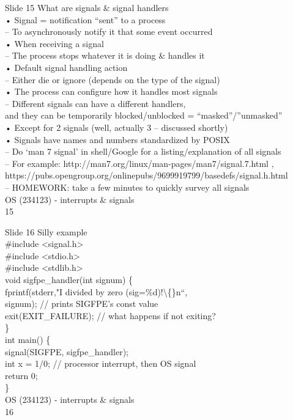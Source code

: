 \documentclass{beamer}
\begin{document}
\begin{frame}{Slide 15}
What are signals \& signal handlers \\• Signal = notification “sent” to a process\\– To asynchronously notify it that some event occurred \\• When receiving a signal\\– The process stops whatever it is doing \& handles it\\• Default signal handling action\\– Either die or ignore (depends on the type of the signal)\\• The process can configure how it handles most signals\\– Different signals can have a different handlers, \\and they can be temporarily blocked/unblocked = “masked”/”unmasked”\\• Except for 2 signals (well, actually 3 – discussed shortly)\\• Signals have names and numbers standardized by POSIX\\– Do ‘man 7 signal’ in shell/Google for a listing/explanation of all signals\\– For example: http://man7.org/linux/man-pages/man7/signal.7.html ,\\https://pubs.opengroup.org/onlinepubs/9699919799/basedefs/signal.h.html\\– HOMEWORK: take a few minutes to quickly survey all signals\\OS (234123) - interrupts \& signals\\15
\end{frame}
\begin{frame}{Slide 16}
Silly example\\\#include <signal.h>\\\#include <stdio.h>\\\#include <stdlib.h>\\void sigfpe\_handler(int signum) \{\\    fprintf(stderr,"I divided by zero (sig=\%d)!\textbackslash\{\}n“,\\            signum);    // prints SIGFPE’s const value\\    exit(EXIT\_FAILURE); // what happens if not exiting?\\\}\\int main() \{\\    signal(SIGFPE, sigfpe\_handler);\\    int x = 1/0; // processor interrupt, then OS signal\\    return 0;\\\}\\OS (234123) - interrupts \& signals\\16
\end{frame}
\end{document}
